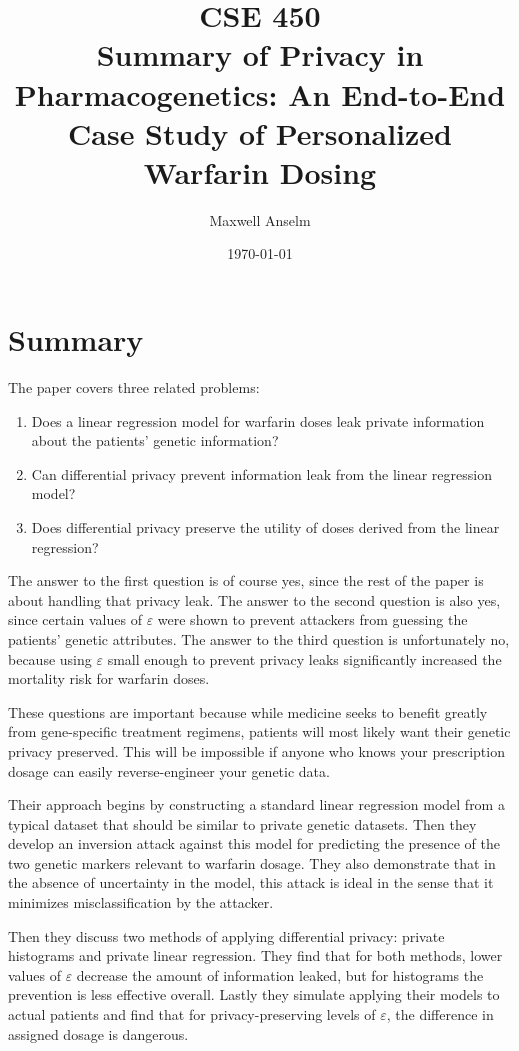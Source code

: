 \documentclass{article}
\title{CSE 450\\Summary of Privacy in Pharmacogenetics: An End-to-End Case Study
of Personalized Warfarin Dosing}
\author{Maxwell Anselm}
\date{\today}
\begin{document}
\maketitle

\section{Summary}

The paper covers three related problems:

\begin{enumerate}
	\item Does a linear regression model for warfarin doses leak private information
about the patients' genetic information?
\item Can differential privacy prevent information leak from the linear
regression model?
\item Does differential privacy preserve the utility of doses derived from the
linear regression?
\end{enumerate}

The answer to the first question is of course yes, since the rest of the paper
is about handling that privacy leak. The answer to the second question is
also yes, since certain values of $\varepsilon$ were shown to prevent attackers
from guessing the patients' genetic attributes. The answer to the third question
is unfortunately no, because using $\varepsilon$ small enough to prevent privacy
leaks significantly increased the mortality risk for warfarin doses.

These questions are important because while medicine seeks to benefit greatly
from gene-specific treatment regimens, patients will most likely want their
genetic privacy preserved. This will be impossible if anyone who knows your
prescription dosage can easily reverse-engineer your genetic data.

Their approach begins by constructing a standard linear regression model from a
typical dataset that should be similar to private genetic datasets. Then they
develop an inversion attack against this model for predicting the presence of
the two genetic markers relevant to warfarin dosage. They also demonstrate that
in the absence of uncertainty in the model, this attack is ideal in the sense
that it minimizes misclassification by the attacker.

Then they discuss two methods of applying differential privacy: private
histograms and private linear regression. They find that for both methods, lower
values of $\varepsilon$ decrease the amount of information leaked, but for
histograms the prevention is less effective overall. Lastly they simulate
applying their models to actual patients and find that for privacy-preserving
levels of $\varepsilon$, the difference in assigned dosage is dangerous.
\end{document}

